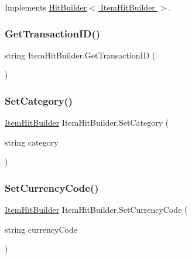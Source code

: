 Implements \hyperlink{class_hit_builder_a4276c57427406e264dc33f8c900ad530}{Hit\+Builder$<$ Item\+Hit\+Builder $>$}.

\mbox{\label{class_item_hit_builder_a1a331446ed79acb6a693815211cc6ab9}} 
\subsubsection{\texorpdfstring{Get\+Transaction\+I\+D()}{GetTransactionID()}}
{\footnotesize\ttfamily string Item\+Hit\+Builder.\+Get\+Transaction\+ID (\begin{DoxyParamCaption}{ }\end{DoxyParamCaption})}

\mbox{\label{class_item_hit_builder_a375deff20797ca5a3c38a8c283923806}} 
\subsubsection{\texorpdfstring{Set\+Category()}{SetCategory()}}
{\footnotesize\ttfamily \hyperlink{class_item_hit_builder}{Item\+Hit\+Builder} Item\+Hit\+Builder.\+Set\+Category (\begin{DoxyParamCaption}\item[{string}]{category }\end{DoxyParamCaption})}

\mbox{\label{class_item_hit_builder_a8a7d3842f29bf6cf999a6419df955e75}} 
\subsubsection{\texorpdfstring{Set\+Currency\+Code()}{SetCurrencyCode()}}
{\footnotesize\ttfamily \hyperlink{class_item_hit_builder}{Item\+Hit\+Builder} Item\+Hit\+Builder.\+Set\+Currency\+Code (\begin{DoxyParamCaption}\item[{string}]{currency\+Code }\end{DoxyParamCaption})}

